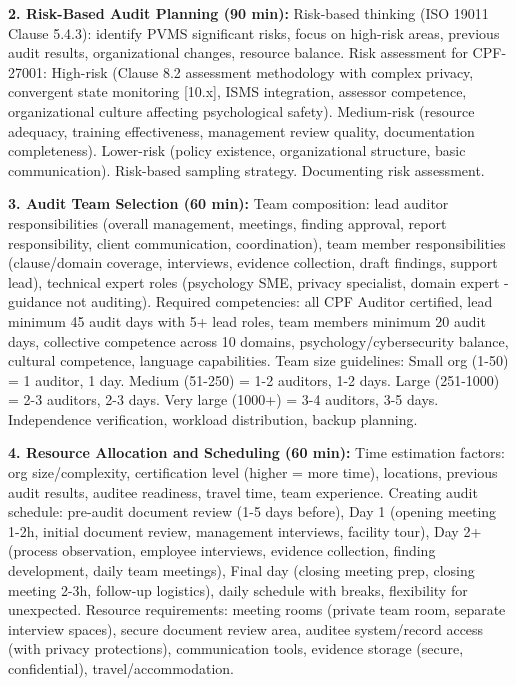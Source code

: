 \documentclass[11pt,a4paper]{article}
\begin{document}
\textbf{2. Risk-Based Audit Planning (90 min):} Risk-based thinking (ISO 19011 Clause 5.4.3): identify PVMS significant risks, focus on high-risk areas, previous audit results, organizational changes, resource balance. Risk assessment for CPF-27001: High-risk (Clause 8.2 assessment methodology with complex privacy, convergent state monitoring [10.x], ISMS integration, assessor competence, organizational culture affecting psychological safety). Medium-risk (resource adequacy, training effectiveness, management review quality, documentation completeness). Lower-risk (policy existence, organizational structure, basic communication). Risk-based sampling strategy. Documenting risk assessment.

\textbf{3. Audit Team Selection (60 min):} Team composition: lead auditor responsibilities (overall management, meetings, finding approval, report responsibility, client communication, coordination), team member responsibilities (clause/domain coverage, interviews, evidence collection, draft findings, support lead), technical expert roles (psychology SME, privacy specialist, domain expert - guidance not auditing). Required competencies: all CPF Auditor certified, lead minimum 45 audit days with 5+ lead roles, team members minimum 20 audit days, collective competence across 10 domains, psychology/cybersecurity balance, cultural competence, language capabilities. Team size guidelines: Small org (1-50) = 1 auditor, 1 day. Medium (51-250) = 1-2 auditors, 1-2 days. Large (251-1000) = 2-3 auditors, 2-3 days. Very large (1000+) = 3-4 auditors, 3-5 days. Independence verification, workload distribution, backup planning.

\textbf{4. Resource Allocation and Scheduling (60 min):} Time estimation factors: org size/complexity, certification level (higher = more time), locations, previous audit results, auditee readiness, travel time, team experience. Creating audit schedule: pre-audit document review (1-5 days before), Day 1 (opening meeting 1-2h, initial document review, management interviews, facility tour), Day 2+ (process observation, employee interviews, evidence collection, finding development, daily team meetings), Final day (closing meeting prep, closing meeting 2-3h, follow-up logistics), daily schedule with breaks, flexibility for unexpected. Resource requirements: meeting rooms (private team room, separate interview spaces), secure document review area, auditee system/record access (with privacy protections), communication tools, evidence storage (secure, confidential), travel/accommodation.
\end{document}
